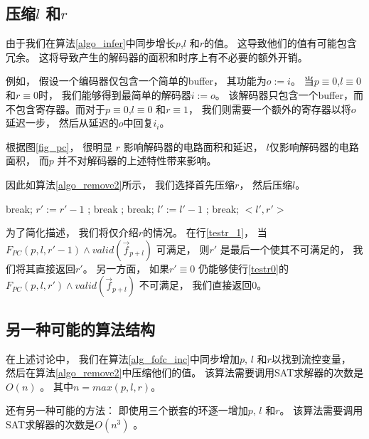 \subsection{压缩$l$ 和$r$}\label{reduceing}
由于我们在算法\ref{algo_infer}中同步增长$p$,$l$ 和$r$的值。
这导致他们的值有可能包含冗余。
这将导致产生的解码器的面积和时序上有不必要的额外开销。

例如，
假设一个编码器仅包含一个简单的buffer，
其功能为$o:=i$。
当$p\equiv 0$,$l\equiv 0$ 和$r\equiv 0$时，
我们能够得到最简单的解码器$i:=o$。
该解码器只包含一个buffer，而不包含寄存器。而对于$p\equiv 0$,$l\equiv 0$ 和$r\equiv 1$，
我们则需要一个额外的寄存器以将$o$ 延迟一步，
然后从延迟的$o$中回复$i_i$。

根据图\ref{fig_pc}，
很明显
$r$ 影响解码器的电路面积和延迟，
$l$仅影响解码器的电路面积，
而$p$ 并不对解码器的上述特性带来影响。

因此如算法\ref{algo_remove2}所示，
我们选择首先压缩$r$，
然后压缩$l$。

\begin{algorithm}[t]
\caption{$RemoveRedundancy(p,l,r)$}
\label{algo_remove2}
\begin{algorithmic}[1]
\label{testr_1}
    \STATE break;
\label{testr0}
    \STATE $r':=r'-1$ ;
    \STATE break ;
  \ENDIF
\ENDFOR
{}
    \STATE break;
    \STATE $l':=l'-1$ ;
    \STATE break;
  \ENDIF
\ENDFOR
\RETURN $<l',r'>$
\end{algorithmic}
\end{algorithm}

为了简化描述，
我们将仅介绍$r$的情况。
在行\ref{testr_1}，
当$F_{PC}(p,l,r'-1)\wedge valid(\vec{f}_{p+l})$ 可满足，
则$r'$ 是最后一个使其不可满足的，
我们将其直接返回$r'$。
另一方面，
如果$r'\equiv 0$ 仍能够使行\ref{testr0}的$F_{PC}(p,l,r')\wedge valid(\vec{f}_{p+l})$ 不可满足，
我们直接返回0。

\subsection{另一种可能的算法结构}\label{alter}

在上述讨论中，
我们在算法\ref{alg_fofc_inc}中同步增加$p$, $l$ 和$r$以找到流控变量，
然后在算法\ref{algo_remove2}中压缩他们的值。
该算法需要调用SAT求解器的次数是$O(n)$ 。
其中$n=max(p,l,r)$。

还有另一种可能的方法：
即使用三个嵌套的环逐一增加$p$, $l$ 和$r$。
该算法需要调用SAT求解器的次数是$O(n^3)$ 。


